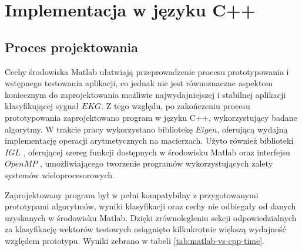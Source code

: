 \section{Implementacja w języku C++}
\subsection{Proces projektowania}
Cechy środowiska Matlab ułatwiają przeprowadzenie procesu prototypowania i wstępnego testowania aplikacji, co jednak nie jest równoznaczne aspektom koniecznym do zaprojektowania możliwie najwydajniejszej i stabilnej aplikacji klasyfikującej sygnał $EKG$. Z tego względu, po zakończeniu procesu prototypowania zaprojektowano program w języku C++, wykorzystujący badane algorytmy. W trakcie pracy wykorzystano bibliotekę $Eigen$, oferującą wydajną implementację operacji arytmetycznych na macierzach. Użyto również biblioteki $IGL$ \cite{libigl-www}, oferującej szereg funkcji dostępnych w środowisku Matlab oraz interfejsu $OpenMP$ \cite{openmp-www}, umożliwiającego tworzenie programów wykorzystujących zalety systemów wieloprocesorowych.

Zaprojektowany program był w pełni kompatybilny z przygotowanymi prototypami algorytmów, wyniki klasyfikacji oraz cechy nie odbiegały od danych uzyskanych w środowisku Matlab. Dzięki zrównolegleniu sekcji odpowiedzialnych za klasyfikację wektorów testowych osiągnięto kilkukrotnie większą wydajność względem prototypu. Wyniki zebrano w tabeli \ref{tab:matlab-vs-cpp-time}.

